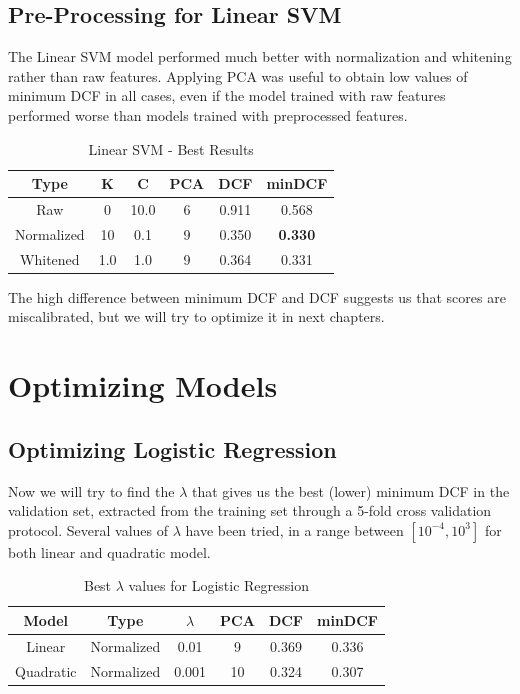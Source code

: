 \documentclass[12pt, twocolumn]{article}
\begin{document}
\subsection{Pre-Processing for Linear SVM}

The Linear SVM model performed much better with normalization and whitening rather than raw features.
Applying PCA was useful to obtain low values of minimum DCF in all cases, even if the model trained
with raw features performed worse than models trained with preprocessed features.

\begin{table}[H]
    \centering
    \tiny
        \begin{tabular}{||c|c|c|c|c|c||}
            \hline
            Type & K & C & PCA & DCF & minDCF \\
            \hline
            \hline
            Raw & 0 & 10.0 & 6 & 0.911 &  0.568  \\
            Normalized & 10 & 0.1 & 9 & 0.350 &  {\bf 0.330}  \\
            Whitened & 1.0 & 1.0 & 9 & 0.364 &  0.331  \\
            \hline
    \end{tabular}
    \caption{Linear SVM - Best Results}
\end{table}

The high difference between minimum DCF and DCF suggests us that scores are miscalibrated, but we will try to
optimize it in next chapters.

\section{Optimizing Models}

\subsection{Optimizing Logistic Regression}

Now we will try to find the $\lambda$ that gives us the best (lower) minimum DCF in the validation set, extracted
from the training set through a 5-fold cross validation protocol.
Several values of $\lambda$ have been tried, in a range between $\left[10^{-4}, 10^3\right]$ for both linear and quadratic model.

\begin{table}[H]
    \tiny
    \centering
        \begin{tabular}{||c|c|c|c|c|c||}
            \hline
            Model & Type & $\lambda$ & PCA & DCF & minDCF \\
            \hline
            \hline
            Linear & Normalized & 0.01 & 9 & 0.369 &  0.336  \\
            Quadratic & Normalized & 0.001 & 10 & 0.324 &  0.307  \\
            \hline
    \end{tabular}
    \caption{Best $\lambda$ values for Logistic Regression}
\end{table}
\end{document}
